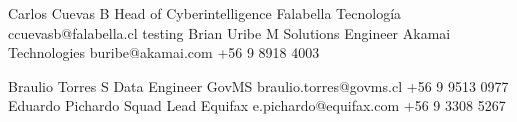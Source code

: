 %
%
%


\begin{referees}
	{Carlos Cuevas B}
	{Head of Cyberintelligence}
	{Falabella Tecnología}
	{ccuevasb@falabella.cl}
	{testing}
	{Brian Uribe M}
	{Solutions Engineer}
	{Akamai Technologies}
	{buribe@akamai.com}
	{+56 9 8918 4003}
\end{referees}

\begin{referees}
	{Braulio Torres S}
	{Data Engineer}
	{GovMS}
	{braulio.torres@govms.cl}
	{+56 9 9513 0977}
	{Eduardo Pichardo}
	{Squad Lead}
	{Equifax}
	{e.pichardo@equifax.com}
	{+56 9 3308 5267}
\end{referees}

